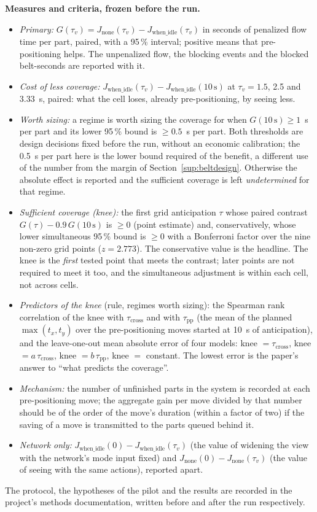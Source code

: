 \documentclass[11pt,a4paper]{article}
\newcommand{\tcross}{\tau_{\mathrm{cross}}}
\newcommand{\tpp}{\tau_{\mathrm{pp}}}
\newcommand{\tv}{\tau_{v}}
\begin{document}
\textbf{Measures and criteria, frozen before the run.}
\begin{itemize}[nosep]
\item \emph{Primary:} $G(\tv)=J_{\mathrm{none}}(\tv)-J_{\mathrm{when\_idle}}(\tv)$ in
  seconds of penalized flow time per part, paired, with a 95\,\% interval; positive means
  that pre-positioning helps. The unpenalized flow, the blocking events and the blocked
  belt-seconds are reported with it.
\item \emph{Cost of less coverage:} $J_{\mathrm{when\_idle}}(\tv)-J_{\mathrm{when\_idle}}(10\,\mathrm{s})$
  at $\tv=1.5$, 2.5 and 3.33~s, paired: what the cell loses, already pre-positioning, by
  seeing less.
\item \emph{Worth sizing:} a regime is worth sizing the coverage for when
  $G(10\,\mathrm{s})\ge1$~s per part and its lower 95\,\% bound is $\ge0.5$~s per part.
  Both thresholds are design decisions fixed before the run, without an economic
  calibration; the 0.5~s per part here is the lower bound required of the benefit, a
  different use of the number from the margin of Section~\ref{sup:beltdesign}.
  Otherwise the absolute effect is reported and the sufficient coverage is left
  \emph{undetermined} for that regime.
\item \emph{Sufficient coverage (knee):} the first grid anticipation $\tau$ whose paired
  contrast $G(\tau)-0.9\,G(10\,\mathrm{s})$ is $\ge0$ (point estimate) and, conservatively,
  whose lower simultaneous 95\,\% bound is $\ge0$ with a Bonferroni factor over the nine
  non-zero grid points ($z=2.773$). The conservative value is the headline. The knee is the
  \emph{first} tested point that meets the contrast; later points are not required to meet
  it too, and the simultaneous adjustment is within each cell, not across cells.
\item \emph{Predictors of the knee} (rule, regimes worth sizing): the Spearman rank
  correlation of the knee with $\tcross$ and with $\tpp$ (the mean of the planned
  $\max(t_x,t_y)$ over the pre-positioning moves started at 10~s of anticipation), and the leave-one-out mean
  absolute error of four models: knee $=\tcross$, knee $=a\,\tcross$, knee $=b\,\tpp$,
  knee $=$ constant. The lowest error is the paper's answer to ``what predicts the
  coverage''.
\item \emph{Mechanism:} the number of unfinished parts in the system is recorded at each
  pre-positioning move; the aggregate gain per move divided by that number should be of
  the order of the move's duration (within a factor of two) if the saving of a move is
  transmitted to the parts queued behind it.
\item \emph{Network only:} $J_{\mathrm{when\_idle}}(0)-J_{\mathrm{when\_idle}}(\tv)$ (the
  value of widening the view with the network's mode input fixed) and
  $J_{\mathrm{none}}(0)-J_{\mathrm{none}}(\tv)$ (the value of seeing with the same actions),
  reported apart.
\end{itemize}
The protocol, the hypotheses of the pilot and the results are recorded in the project's
methods documentation, written before and after the run respectively.
\end{document}
